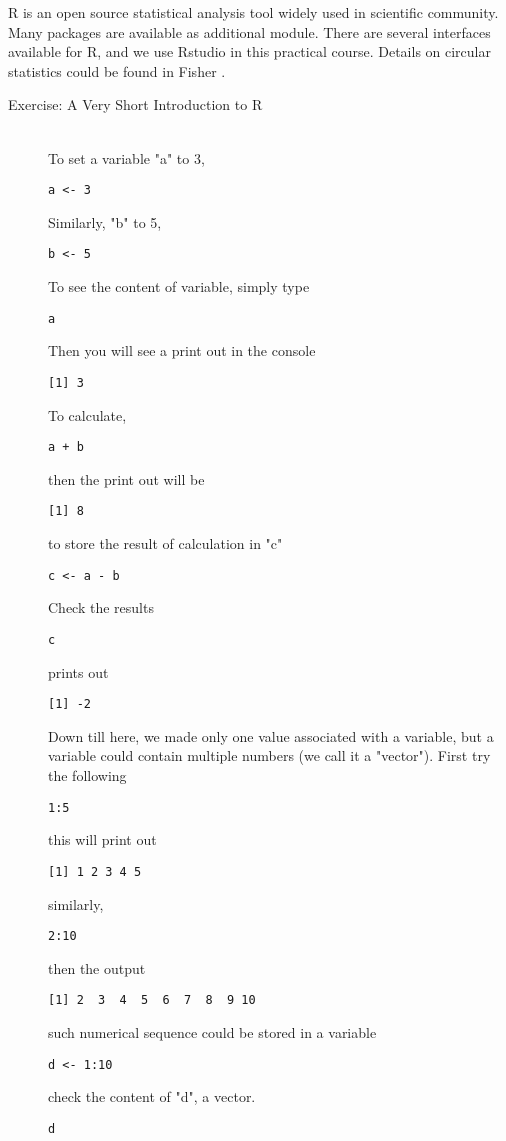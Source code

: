 \documentclass[11pnt]{article}
\begin{document}
R is an open source statistical analysis tool widely used in scientific community. Many packages are available as additional module. There are several interfaces available for R, and we use Rstudio in this practical course. Details on circular statistics could be found in Fisher \citep{Fisher1993}.

\begin{description}

\item[Exercise: A Very Short Introduction to R]\hfill\\

To set a variable "a" to 3,

\verb"a <- 3"

Similarly, "b" to 5,

\verb"b <- 5"

To see the content of variable, simply type

\verb"a"

Then you will see a print out in the console

\verb"[1] 3"

To calculate, 

\verb"a + b"

then the print out will be

\verb"[1] 8"

to store the result of calculation in "c"

\verb"c <- a - b"

Check the results

\verb"c"

prints out

\verb"[1] -2"

Down till here, we made only one value associated with a variable, but a variable could contain multiple numbers (we call it a "vector"). First try the following

\verb"1:5"

this will print out

\verb"[1] 1 2 3 4 5"

similarly, 

\verb"2:10"

then the output

\verb"[1] 2  3  4  5  6  7  8  9 10"

such numerical sequence could be stored in a variable

\verb"d <- 1:10"

check the content of "d", a vector. 

\verb"d"


\end{description}
\end{document}
